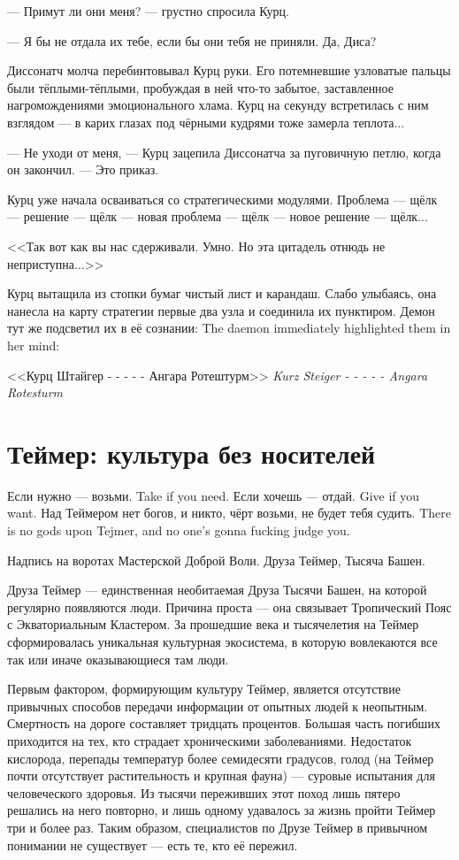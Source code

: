 --- Примут ли они меня? --- грустно спросила Курц.

--- Я бы не отдала их тебе, если бы они тебя не приняли.
Да, Диса?

Диссонатч молча перебинтовывал Курц руки.
Его потемневшие узловатые пальцы были тёплыми-тёплыми, пробуждая в ней что-то забытое, заставленное нагромождениями эмоционального хлама.
Курц на секунду встретилась с ним взглядом --- в карих глазах под чёрными кудрями тоже замерла теплота...

--- Не уходи от меня, --- Курц зацепила Диссонатча за пуговичную петлю, когда он закончил.
--- Это приказ.

\asterism

Курц уже начала осваиваться со стратегическими модулями.
Проблема --- щёлк --- решение --- щёлк --- новая проблема --- щёлк --- новое решение --- щёлк...

<<Так вот как вы нас сдерживали.
Умно.
Но эта цитадель отнюдь не неприступна...>>

Курц вытащила из стопки бумаг чистый лист и карандаш.
Слабо улыбаясь, она нанесла на карту стратегии первые два узла и соединила их пунктиром.
{Демон тут же подсветил их в её сознании:}
{The daemon immediately highlighted them in her mind:}

{<<Курц Штайгер - - - - - Ангара Ротештурм>>}
{\textit{Kurz Steiger - - - - - Angara Rotesturm}}

\appendix

\chapter{Теймер: культура без носителей}

\epigraph{
{Если нужно --- возьми.}
{Take if you need.}
{Если хочешь --- отдай.}
{Give if you want.}
{Над Теймером нет богов, и никто, чёрт возьми, не будет тебя судить.}
{There is no gods upon Tejmer, and no one's gonna fucking judge you.}
}
{
Надпись на воротах Мастерской Доброй Воли.
Друза Теймер, Тысяча Башен.
}

Друза Теймер --- единственная необитаемая Друза Тысячи Башен, на которой регулярно появляются люди.
Причина проста --- она связывает Тропический Пояс с Экваториальным Кластером.
За прошедшие века и тысячелетия на Теймер сформировалась уникальная культурная экосистема, в которую вовлекаются все так или иначе оказывающиеся там люди.

Первым фактором, формирующим культуру Теймер, является отсутствие привычных способов передачи информации от опытных людей к неопытным.
Смертность на дороге составляет тридцать процентов.
Большая часть погибших приходится на тех, кто страдает хроническими заболеваниями.
Недостаток кислорода, перепады температур более семидесяти градусов, голод (на Теймер почти отсутствует растительность и крупная фауна) --- суровые испытания для человеческого здоровья.
Из тысячи переживших этот поход лишь пятеро решались на него повторно, и лишь одному удавалось за жизнь пройти Теймер три и более раз.
Таким образом, специалистов по Друзе Теймер в привычном понимании не существует --- есть те, кто её пережил.

